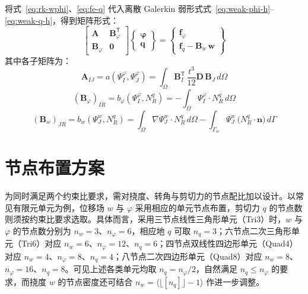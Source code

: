 \documentclass[internationalmaster]{hquThesis}
\begin{document}
将式~\eqref{eq:rk-wphi}、\eqref{eq:fe-q} 代入离散 Galerkin 弱形式式~\eqref{eq:weak-phi-h}--\eqref{eq:weak-q-h}，得到矩阵形式：
\begin{equation}
    \begin{bmatrix}
        \boldsymbol A & \boldsymbol B_\varphi^{\mathsf{T}}\\
        \boldsymbol B_\varphi & \boldsymbol 0
    \end{bmatrix}
    \begin{Bmatrix}
        \boldsymbol{\varphi}\\
        \boldsymbol q
    \end{Bmatrix}
    =
    \begin{Bmatrix}
        \boldsymbol f_\varphi\\
        \boldsymbol f_q-\boldsymbol B_w\,\boldsymbol w
    \end{Bmatrix}
    \label{eq:block-system}
\end{equation}
其中各子矩阵为：
\begin{equation}
    \boldsymbol A_{IJ} = a(\Psi_I^{\varphi},\Psi_J^{\varphi}) = \int_\Omega \boldsymbol B_I^{\mathsf{T}}\,\frac{t^{3}}{12}\boldsymbol D\,\boldsymbol B_J\,d\Omega
    \label{eq:mat-A}
\end{equation}
\begin{equation}
    (\boldsymbol B_\varphi)_{IR} = b_\varphi(\Psi_I^{\varphi},N_R^{q}) = -\int_\Omega \Psi_I^{\varphi}\cdot N_R^{q}\,d\Omega
    \label{eq:mat-Bphi}
\end{equation}
\begin{equation}
    (\boldsymbol B_w)_{JR} = b_w(\Psi_J^{w},N_R^{q})
    = \int_\Omega \nabla\Psi_J^{w}\cdot N_R^{q}\,d\Omega
    - \int_{\Gamma_w}\Psi_J^{w}\,\bigl(N_R^{q}\cdot\boldsymbol n\bigr)\,d\Gamma
    \label{eq:mat-Bw}
\end{equation}

\section{节点布置方案}

为同时满足两个约束比要求，需对挠度、转角与剪切力的节点配比加以设计。以常见有限元单元为例，位移场 $w$ 与 $\varphi$ 采用相应的单元节点布置，剪切力 $q$ 的节点数则须按约束比要求选取。具体而言，采用三节点线性三角形单元（Tri3）时，$w$ 与 $\varphi$ 的节点数分别为 $n_w=3$、$n_\varphi=6$，相应地 $q$ 可取 $n_q=3$；六节点二次三角形单元（Tri6）对应 $n_w=6$、$n_\varphi=12$、$n_q=6$；四节点双线性四边形单元（Quad4）对应 $n_w=4$、$n_\varphi=8$、$n_q=4$；八节点二次四边形单元（Quad8）对应 $n_w=8$、$n_\varphi=16$、$n_q=8$。可见上述各类单元均取 $n_q=n_\varphi/2$，自然满足 $n_q\leq n_\varphi$ 的要求，而挠度 $w$ 的节点密度还可结合 $n_w=\bigl\langle\lfloor[n_q]\rfloor-1\bigr\rangle$ 作进一步调整。
\end{document}
